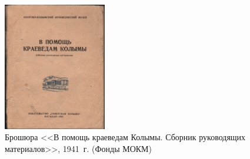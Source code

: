 \begin{figure}
    \begin{center}
    \includegraphics[width=0.4\textwidth]{authors/usupova-fig-1.jpg}
  \end{center}
  \caption{Брошюра <<В помощь краеведам Колымы. Сборник руководящих материалов>>, 1941~г. (Фонды МОКМ)}
  \label{fig:usupova-fig-1}
\end{figure}
